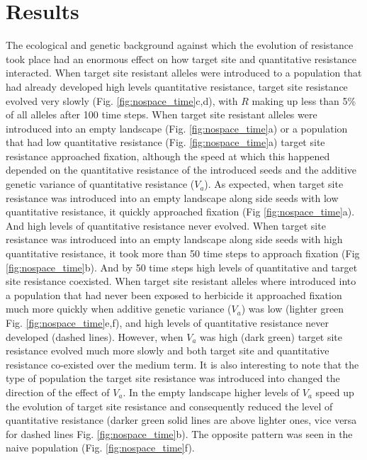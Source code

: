 \documentclass[10pt,letterpaper]{article}
\begin{document}
\section*{Results}
The ecological and genetic background against which the evolution of resistance took place had an enormous effect on how target site and quantitative resistance interacted. When target site resistant alleles were introduced to a population that had already developed high levels quantitative resistance, target site resistance evolved very slowly (Fig. \ref{fig:nospace_time}c,d), with $R$ making up less than 5\% of all alleles after 100 time steps. When target site resistant alleles were introduced into an empty landscape (Fig. \ref{fig:nospace_time}a) or a population that had low quantitative resistance (Fig. \ref{fig:nospace_time}a) target site resistance approached fixation, although the speed at which this happened depended on the quantitative resistance of the introduced seeds and the additive genetic variance of quantitative resistance ($V_a$). As expected, when target site resistance was introduced into an empty landscape along side seeds with low quantitative resistance, it quickly approached fixation (Fig \ref{fig:nospace_time}a). And high levels of quantitative resistance never evolved. When target site resistance was introduced into an empty landscape along side seeds with high quantitative resistance, it took more than 50 time steps to approach fixation (Fig \ref{fig:nospace_time}b). And by 50 time steps high levels of quantitative and target site resistance coexisted. When target site resistant alleles where introduced into a population that had never been exposed to herbicide it approached fixation much more quickly when additive genetic variance ($V_a$) was low (lighter green Fig. \ref{fig:nospace_time}e,f), and high levels of quantitative resistance never developed (dashed lines). However, when $V_a$ was high (dark green) target site resistance evolved much more slowly and both target site and quantitative resistance co-existed over the medium term. It is also interesting to note that the type of population the target site resistance was introduced into changed the direction of the effect of $V_a$. In the empty landscape higher levels of $V_a$ speed up the evolution of target site resistance and consequently reduced the level of quantitative resistance (darker green solid lines are above lighter ones, vice versa for dashed lines Fig. \ref{fig:nospace_time}b). The opposite pattern was seen in the naive population (Fig. \ref{fig:nospace_time}f).  
\end{document}
